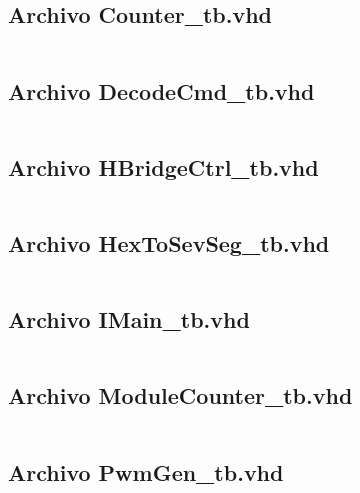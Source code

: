 \documentclass[12pt]{article}
\begin{document}
\subsection{Archivo \textbf{Counter\_tb.vhd }}
\inputminted[bgcolor=bgcodecolor,xleftmargin=20pt,breaklines,linenos,fontsize=\scriptsize]{vhdl}{../GHDL/Counter_tb.vhd}
\newpage

\subsection{Archivo \textbf{DecodeCmd\_tb.vhd }}
\inputminted[bgcolor=bgcodecolor,xleftmargin=20pt,breaklines,linenos,fontsize=\scriptsize]{vhdl}{../GHDL/DecodeCmd_tb.vhd}
\newpage

\subsection{Archivo \textbf{HBridgeCtrl\_tb.vhd }}
\inputminted[bgcolor=bgcodecolor,xleftmargin=20pt,breaklines,linenos,fontsize=\scriptsize]{vhdl}{../GHDL/HBridgeCtrl_tb.vhd}
\newpage

\subsection{Archivo \textbf{HexToSevSeg\_tb.vhd }}
\inputminted[bgcolor=bgcodecolor,xleftmargin=20pt,breaklines,linenos,fontsize=\scriptsize]{vhdl}{../GHDL/HexToSevSeg_tb.vhd}
\newpage

\subsection{Archivo \textbf{IMain\_tb.vhd }}
\inputminted[bgcolor=bgcodecolor,xleftmargin=20pt,breaklines,linenos,fontsize=\scriptsize]{vhdl}{../GHDL/IMain_tb.vhd}
\newpage

\subsection{Archivo \textbf{ModuleCounter\_tb.vhd }}
\inputminted[bgcolor=bgcodecolor,xleftmargin=20pt,breaklines,linenos,fontsize=\scriptsize]{vhdl}{../GHDL/ModuleCounter_tb.vhd}
\newpage

\subsection{Archivo \textbf{PwmGen\_tb.vhd }}
\inputminted[bgcolor=bgcodecolor,xleftmargin=20pt,breaklines,linenos,fontsize=\scriptsize]{vhdl}{../GHDL/PwmGen_tb.vhd}
\newpage
\end{document}

